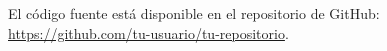 \documentclass{article}
\begin{document}
El código fuente está disponible en el repositorio de GitHub: \url{https://github.com/tu-usuario/tu-repositorio}.
\end{document}
